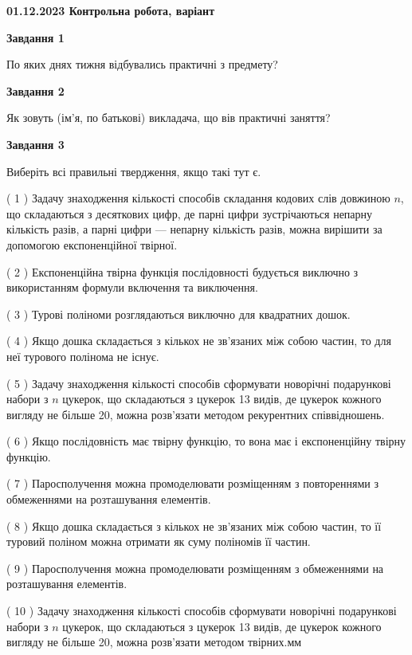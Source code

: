 \documentclass[12pt, ukrainian]{article}
\begin{document}
\begin {large}

\textbf{01.12.2023 Контрольна робота, варіант  }\par


{
{\begin {center}\textbf{Завдання 1}\end {center}}\par
По яких днях тижня відбувались практичні з предмету?\par
{\begin {center}\textbf{Завдання 2}\end {center}}\par
Як зовуть (ім'я, по батькові) викладача, що вів практичні заняття?\par
{\begin {center}\textbf{Завдання 3}\end {center}}\par
Виберіть всі правильні твердження, якщо такі тут є.\par
\vspace{2mm}
( 1 ) Задачу знаходження кількості способів складання кодових слів довжиною $n$, що складаються з десяткових цифр, де парні цифри зустрічаються непарну кількість разів, а парні цифри — непарну кількість разів, можна вирішити за допомогою експоненційної твірної.%

( 2 ) Експоненційна твірна функція послідовності будується виключно з використанням формули включення та виключення.%

( 3 ) Турові поліноми розглядаються виключно для квадратних дошок.%

( 4 ) Якщо дошка складається з кількох не зв’язаних між собою частин, то для неї турового полінома не існує.%

( 5 ) Задачу знаходження кількості способів сформувати новорічні подарункові набори з $n$ цукерок, що складаються з цукерок 13 видів, де цукерок кожного вигляду не більше 20, можна розв’язати методом рекурентних співвідношень.%

( 6 ) Якщо послідовність має твірну функцію, то вона має і експоненційну твірну функцію.%

( 7 ) Паросполучення можна промоделювати розміщенням з повтореннями з обмеженнями на розташування елементів.%

( 8 ) Якщо дошка складається з кількох не зв’язаних між собою частин, то її туровий поліном можна отримати як суму поліномів її частин.%

( 9 ) Паросполучення можна промоделювати розміщенням з обмеженнями на розташування елементів.%

( 10 ) Задачу знаходження кількості способів сформувати новорічні подарункові набори з $n$ цукерок, що складаються з цукерок 13 видів, де цукерок кожного вигляду не більше 20, можна розв’язати методом твірних.мм%
}
\end {large}

\vspace{4mm}
\newpage
\end{document}
